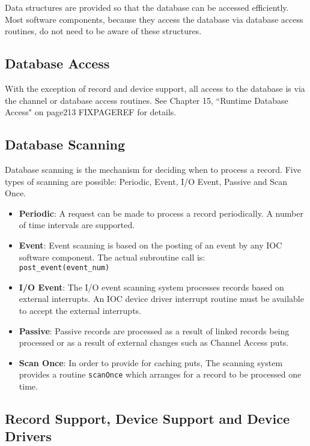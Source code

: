 Data structures are provided so that the database can be accessed efficiently. Most software components, because they 
access the database via database access routines, do not need to be aware of these structures.

\subsection{Database Access}

With the exception of record and device support, all access to the database is via the channel or database access routines. 
See Chapter 15, ``Runtime Database Access" on page213 FIXPAGEREF for details.

\subsection{Database Scanning}

Database scanning is the mechanism for deciding when to process a record. Five types of scanning are possible: Periodic, 
Event, I/O Event, Passive and Scan Once.

\begin{itemize}
\item \textbf{Periodic}:  A request can be made to process a record periodically. A number of time intervals are supported.

\item \textbf{Event}:  Event scanning is based on the posting of an event by any IOC software component. The actual subroutine 
call is: \\
\verb|post_event(event_num)|
\item \textbf{I/O Event}:  The I/O event scanning system processes records based on external interrupts. An IOC device driver 
interrupt routine must be available to accept the external interrupts.

\item \textbf{Passive}:  Passive records are processed as a result of linked records being processed or as a result of external 
changes such as Channel Access puts.

\item \textbf{Scan Once}: In order to provide for caching puts, The scanning system provides a routine \verb|scanOnce| which 
arranges for a record to be processed one time.
\end{itemize}

\subsection{Record Support, Device Support and Device Drivers}

